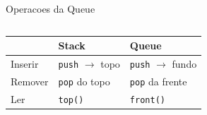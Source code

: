 \documentclass[aspectratio=169,10pt]{beamer}
\begin{document}
\begin{frame}[shrink=2]{Operacoes da Queue}
\begin{columns}[t]
\begin{tcolorbox}[caixaVerde,title={Dica de Prova}]
      \end{tcolorbox}
  \end{columns}
  \vspace{0.12cm}
  \begin{tcolorbox}[caixaAzul,title={Diferença critica: Queue vs Stack}]
    \centering\footnotesize
    \begin{tabular}{lll}
      \toprule
      & \textbf{Stack} & \textbf{Queue}\\
      \midrule
      Inserir & \texttt{push} $\to$ topo & \texttt{push} $\to$ fundo\\
      Remover & \texttt{pop} do topo & \texttt{pop} da frente\\
      Ler     & \texttt{top()} & \texttt{front()}\\
      \bottomrule
    \end{tabular}
  \end{tcolorbox}
\end{frame}
\end{document}
